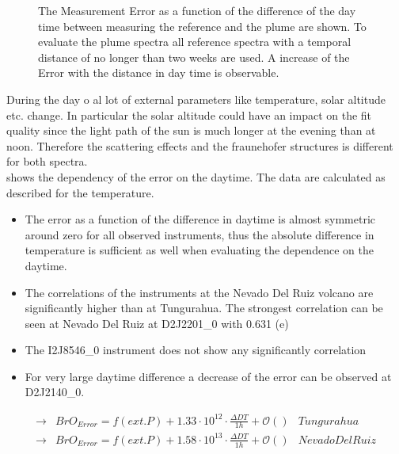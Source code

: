 \documentclass  [
  paper    = a4,
  BCOR     = 10mm,
  twoside,
  fontsize = 12pt,
  fleqn,
  toc      = bibnumbered,
  toc      = listofnumbered,
  numbers  = noendperiod,
  headings = normal,
  listof   = leveldown,
  version  = 3.03
]                                       {scrreprt}
\begin{document}
\begin{figure}
		\caption{The   Measurement Error as a function of the difference of the day time between measuring the reference and the plume are shown. To evaluate the plume spectra all reference spectra with a temporal distance of no longer than two weeks are used. A increase of the   Error with the distance in day time is observable.}
		\label{fig:diffdaytime}
	\end{figure}
	During the day o al lot of external parameters like temperature, solar altitude etc. change. In particular the solar altitude could have an impact on the fit quality since the light path of the sun is much longer at the evening than at noon. Therefore the scattering effects and the fraunehofer structures is different for both spectra.\\
	 shows the dependency of the  error on the daytime. The data are calculated as described for the temperature. 
	
	\begin{itemize}
		\item The   error as a function of the difference in daytime is almost symmetric around zero for all observed instruments, thus the absolute difference in temperature is sufficient as well when evaluating the dependence on the daytime.
		\item The correlations of the instruments at the Nevado Del Ruiz volcano are significantly higher than at Tungurahua. The strongest correlation can be seen at Nevado Del Ruiz at D2J2201\_0 with 0.631 (e)
		\item The I2J8546\_0 instrument does not show any significantly correlation
		\item For very large daytime difference a decrease of the   error can be observed at D2J2140\_0.
	\end{itemize}
		\begin{align*}
		\rightarrow&  BrO_{Error} = f(ext. P)+1.33\cdot10^{12}\cdot\frac{\Delta DT}{1h}  + \mathcal{O}\left(\right)& Tungurahua\\
		\rightarrow&  BrO_{Error} = f(ext. P)+1.58\cdot10^{13}\cdot\frac{\Delta DT}{1h} + \mathcal{O}\left(\right) & Nevado Del Ruiz\\
		\end{align*}
\end{document}
